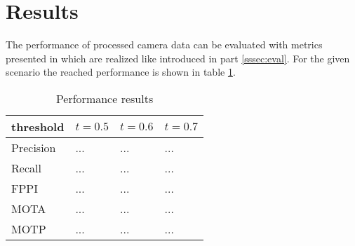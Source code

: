\section{Results}
	The performance of processed camera data can be evaluated with metrics presented in \cite{Reway} which are realized like introduced in part \ref{sssec:eval}. For the given scenario the reached performance is shown in table \ref{tab:res}.
	
	\begin{table}[h]
		\caption{Performance results}
		\begin{tabularx}{\columnwidth}{XXXX}
			\toprule
			\textbf{threshold} & $t=0.5$ & $t=0.6$ & $t=0.7$ \\
			\toprule
			Precision & ... & ... & ... \\
			\midrule
			Recall & ... & ... & ... \\
			\midrule		
			FPPI & ... & ... & ... \\
			\midrule
			MOTA & ... & ... & ... \\
			\midrule
			MOTP & ... & ... & ... \\
			\bottomrule
		\end{tabularx}
		\label{tab:res}
	\end{table}